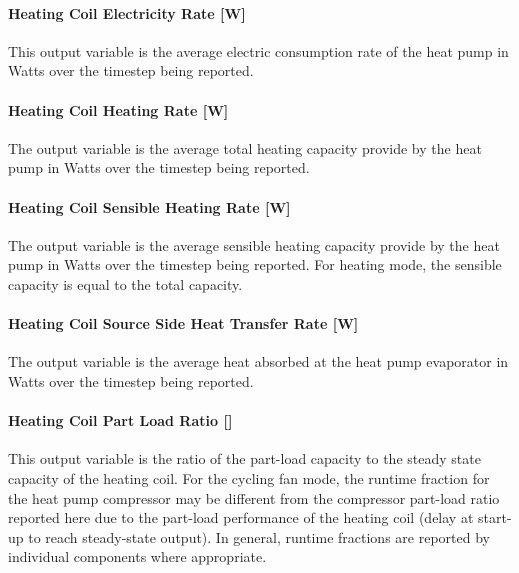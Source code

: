 \paragraph{Heating Coil Electricity Rate {[}W{]}}\label{heating-coil-electric-power-w-6}

This output variable is the average electric consumption rate of the heat pump in Watts over the timestep being reported.

\paragraph{Heating Coil Heating Rate {[}W{]}}\label{heating-coil-heating-rate-w-9}

The output variable is the average total heating capacity provide by the heat pump in Watts over the timestep being reported.

\paragraph{Heating Coil Sensible Heating Rate {[}W{]}}\label{heating-coil-sensible-heating-rate-w}

The output variable is the average sensible heating capacity provide by the heat pump in Watts over the timestep being reported. For heating mode, the sensible capacity is equal to the total capacity.

\paragraph{Heating Coil Source Side Heat Transfer Rate {[}W{]}}\label{heating-coil-source-side-heat-transfer-rate-w}

The output variable is the average heat absorbed at the heat pump evaporator in Watts over the timestep being reported.

\paragraph{Heating Coil Part Load Ratio {[]}}\label{heating-coil-part-load-ratio}

This output variable is the ratio of the part-load capacity to the steady state capacity of the heating coil. For the cycling fan mode, the runtime fraction for the heat pump compressor may be different from the compressor part-load ratio reported here due to the part-load performance of the heating coil (delay at start-up to reach steady-state output). In general, runtime fractions are reported by individual components where appropriate.

